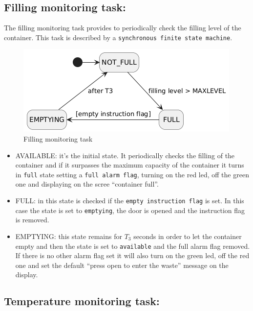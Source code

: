 \documentclass[a4paper,12pt]{report}
\begin{document}
        \subsection{Filling monitoring task:}

            The filling monitoring task provides to periodically check the filling level of the container.
            This task is described by a \texttt{synchronous finite state machine}. 

            \begin{figure}[H]
        	\centering{}
                \includegraphics[width=\textwidth]{img/filling_task.png}
        	\caption{Filling monitoring task}
        	\label{img:filling_task}
            \end{figure}

            \begin{itemize}
                \item AVAILABLE: it's the initial state. It periodically checks the filling of the container and if it surpasses the maximum capacity of the container it turns in \texttt{full} state setting a \texttt{full alarm flag}, turning on the red led, off the green one and displaying on the scree ``container full''.
                \item FULL: in this state is checked if the \texttt{empty instruction flag} is set. In this case the state is set to \texttt{emptying}, the door is opened and the instruction flag is removed.
                \item EMPTYING: this state remains for $T_3$ seconds in order to let the container empty and then the state is set to \texttt{available} and the full alarm flag removed. If there is no other alarm flag set it will also turn on the green led, off the red one and set the default ``press open to enter the waste'' message on the display.
            \end{itemize}
        
        \subsection{Temperature monitoring task:}
\end{document}
